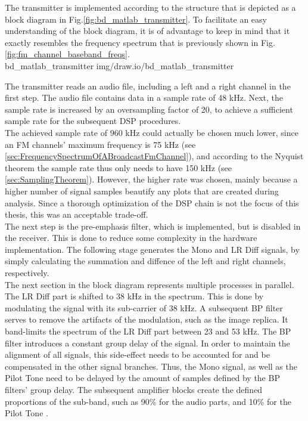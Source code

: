 The transmitter is implemented according to the structure that is depicted as a block diagram in Fig.\ref{fig:bd_matlab_transmitter}.
To facilitate an easy understanding of the block diagram, it is of advantage to keep in mind that it exactly resembles the frequency spectrum that is previously shown in Fig.\ref{fig:fm_channel_baseband_freqs}.\\

 {bd_matlab_transmitter} {img/draw.io/bd_matlab_transmitter}

The transmitter reads an audio file, including a left and a right channel in the first step.
The audio file contains data in a sample rate of 48 kHz.
Next, the sample rate is increased by an oversampling factor of 20, to achieve a sufficient sample rate for the subsequent DSP procedures.\\

The achieved sample rate of 960 kHz could actually be chosen much lower, since an FM channels' maximum frequency is 75 kHz (see \ref{sec:FrequencySpectrumOfABroadcastFmChannel}), and according to the Nyquist theorem the sample rate thus only needs to have 150 kHz (see \ref{sec:SamplingTheorem}).
However, the higher rate was chosen, mainly because a higher number of signal samples beautify any plots that are created during analysis.
Since a thorough optimization of the DSP chain is not the focus of this thesis, this was an acceptable trade-off.\\

The next step is the pre-emphasis filter, which is implemented, but is disabled in the receiver.
This is done to reduce some complexity in the hardware implementation.
The following stage generates the Mono and LR Diff signals, by simply calculating the summation and diffence of the left and right channels, respectively.\\

The next section in the block diagram represents multiple processes in parallel.
The LR Diff part is shifted to 38 kHz in the spectrum.
This is done by modulating the signal with its sub-carrier of 38 kHz.
A subsequent BP filter serves to remove the artifacts of the modulation, such as the image replica.
It band-limits the spectrum of the LR Diff part between 23 and 53 kHz.
The BP filter introduces a constant group delay of the signal.
In order to maintain the alignment of all signals, this side-effect needs to be accounted for and be compensated in the other signal branches.
Thus, the Mono signal, as well as the Pilot Tone need to be delayed by the amount of samples defined by the BP filters' group delay.
The subsequent amplifier blocks create the defined proportions of the sub-band, such as 90\% for the audio parts, and 10\% for the Pilot Tone \cite{FmMultiplexingForStereo}.\\

